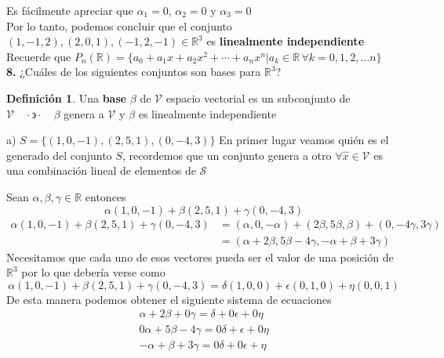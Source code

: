 \documentclass[letterpaper]{article}
\newcommand{\tq}{ \quad \cdot  \backepsilon \cdot \quad }
\newcommand{\R}{\mathds{R}}
\renewcommand{\*}{\cdot}
\theoremstyle{definition}
\newtheorem{definition}{Definición}
\begin{document}
Es fácilmente apreciar que $\alpha_{1}=0$, $\alpha_{2}=0$ y $\alpha_{3}=0$\\

Por lo tanto, podemos concluir que el conjunto $ (1,-1,2), (2,0,1),(-1,2,-1) \in \mathbb{R}^{3}$ es \textbf{linealmente independiente}\\

Recuerde que $P_{n}(\mathbb{R}) = \{ a_0 +  a_1x +  a_2x^2 + \cdots +  a_n x^n \big\vert a_k \in \mathbb{R} \,  \forall k = 0,1,2,\dots n\}$
\\

\noindent \textbf{8.} ¿Cuáles de los siguientes conjuntos son bases para $\mathbb{R}^{3}$?
	\begin{definition}
		Una \textbf{base} $ \beta $ de $ \mathcal{V} $ espacio vectorial es un subconjunto de $ \mathcal{V} \tq \beta$  genera a $ \mathcal{V} $ y $ \beta $ es linealmente independiente
	\end{definition}

	a)  $S = \lbrace (1,0,-1),(2,5,1),(0,-4,3) \rbrace$
	En primer lugar veamos quién es el generado del conjunto $ S $, recordemos que un conjunto genera a otro $ \forall \hat{x} \in \mathcal{V} $ es una combinación lineal de elementos de $ \mathcal{S} $ 
	
	Sean $ \alpha, \beta, \gamma \in \R $ entonces
	\[ \alpha(1,0,-1) + \beta(2,5,1) + \gamma(0,-4,3)  \]
	\begin{align*}
		\alpha(1,0,-1)+ \beta(2,5,1)+ \gamma(0,-4,3) & = (\alpha,0,-\alpha) + (2\beta,5\beta,\beta) + (0,-4\gamma,3\gamma)\\
		& = (\alpha + 2\beta ,5\beta -4\gamma,-\alpha + \beta +3\gamma)
	\end{align*}
	Necesitamos que cada uno de esos vectores pueda ser el valor de una posición de $ \R^3 $ por lo que debería verse como \[ 	\alpha(1,0,-1)+ \beta(2,5,1)+ \gamma(0,-4,3) = \delta(1,0,0) + \epsilon(0,1,0) + \eta(0,0,1) \] De esta manera podemos obtener el siguiente sistema de ecuaciones
	\begin{align*}
		\alpha + 2\beta + 0\gamma = \delta + 0\epsilon + 0\eta\\
		0\alpha + 5\beta -4\gamma = 0\delta + \epsilon + 0\eta\\
		-\alpha + \beta +3\gamma = 0\delta +0\epsilon + \eta
	\end{align*}
	
\end{document}
